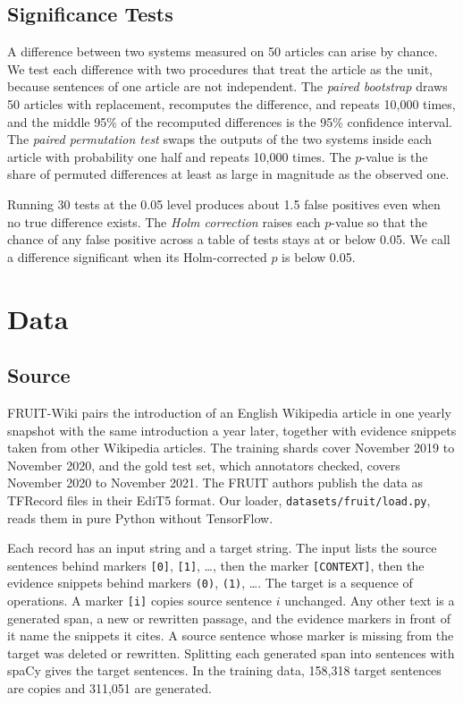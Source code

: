\documentclass[]{paper}
\begin{document}
\subsection{Significance Tests}

A difference between two systems measured on 50 articles can arise by chance. We test each difference with two procedures that treat the article as the unit, because sentences of one article are not independent. The \emph{paired bootstrap} \citep{efron-tibshirani-1993-bootstrap} draws 50 articles with replacement, recomputes the difference, and repeats 10,000 times, and the middle 95\% of the recomputed differences is the 95\% confidence interval. The \emph{paired permutation test} swaps the outputs of the two systems inside each article with probability one half and repeats 10,000 times. The $p$-value is the share of permuted differences at least as large in magnitude as the observed one.

Running 30 tests at the 0.05 level produces about 1.5 false positives even when no true difference exists. The \emph{Holm correction} \citep{holm-1979-simple} raises each $p$-value so that the chance of any false positive across a table of tests stays at or below 0.05. We call a difference significant when its Holm-corrected $p$ is below 0.05.

\section{Data}
\label{sec:data}

\subsection{Source}

FRUIT-Wiki \citep{iv-etal-2022-fruit} pairs the introduction of an English Wikipedia article in one yearly snapshot with the same introduction a year later, together with evidence snippets taken from other Wikipedia articles. The training shards cover November 2019 to November 2020, and the gold test set, which annotators checked, covers November 2020 to November 2021. The FRUIT authors publish the data as TFRecord files in their EdiT5 format. Our loader, \texttt{datasets/fruit/load.py}, reads them in pure Python without TensorFlow.

Each record has an input string and a target string. The input lists the source sentences behind markers \texttt{[0]}, \texttt{[1]}, \ldots, then the marker \texttt{[CONTEXT]}, then the evidence snippets behind markers \texttt{(0)}, \texttt{(1)}, \ldots. The target is a sequence of operations. A marker \texttt{[i]} copies source sentence $i$ unchanged. Any other text is a generated span, a new or rewritten passage, and the evidence markers in front of it name the snippets it cites. A source sentence whose marker is missing from the target was deleted or rewritten. Splitting each generated span into sentences with spaCy gives the target sentences. In the training data, 158,318 target sentences are copies and 311,051 are generated.
\end{document}
